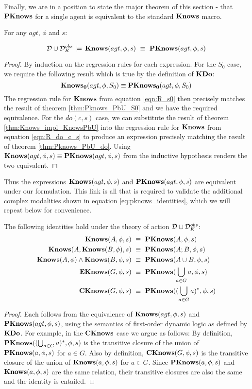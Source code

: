 Finally, we are in a position to state the major theorem of this section
- that $\mathbf{PKnows}$ for a single agent is equivalent to the standard
$\mathbf{Knows}$ macro.

\begin{thm}
For any $agt$, $\phi$ and $s$:

\[
\mathcal{D}\cup\mathcal{D}_{K}^{obs}\,\models\,\mathbf{Knows}(agt,\phi,s)\,\,\equiv\,\,\mathbf{PKnows}(agt,\phi,s)\]

\end{thm}
\begin{proof}
By induction on the regression rules for each expression. For the
$S_{0}$ case, we require the following result which is true by the
definition of $\mathbf{KDo}$:\[
\mathbf{Knows_{0}}(agt,\phi,S_{0})\equiv\mathbf{PKnows_{0}}(agt,\phi,S_{0})\]
 The regression rule for $\mathbf{Knows}$ from equation \eqref{eqn:R_s0}
then precisely matches the result of theorem \ref{thm:Pknows_PbU_S0}
and we have the required equivalence. For the $do(c,s)$ case, we
can substitute the result of theorem \ref{thm:Knows_impl_KnowsPbU}
into the regression rule for $\mathbf{Knows}$ from equation \eqref{eqn:R_do_c_s}
to produce an expression precisely matching the result of theorem
\ref{thm:Pknows_PbU_do}. Using $\mathbf{Knows}(agt,\phi,s)\equiv\mathbf{PKnows}(agt,\phi,s)$
from the inductive hypothesis renders the two equivalent. 
\end{proof}
\medskip{}


Thus the expressions $\mathbf{Knows}(agt,\phi,s)$ and $\mathbf{PKnows}(agt,\phi,s)$
are equivalent under our formulation. This link is all that is required
to validate the additional complex modalities shown in equation \eqref{eq:pknows_identities},
which we will repeat below for convenience.

\begin{thm}
The following identities hold under the theory of action $\mathcal{D}\cup\mathcal{D}_{K}^{obs}$:\begin{align*}
\mathbf{Knows}(A,\phi,s) & \,\,\equiv\,\,\mathbf{PKnows}(A,\phi,s)\\
\mathbf{Knows}(A,\mathbf{Knows}(B,\phi),s) & \,\,\equiv\,\,\mathbf{PKnows}(A;B,\phi,s)\\
\mathbf{Knows}(A,\phi)\wedge\mathbf{Knows}(B,\phi,s) & \,\,\equiv\,\,\mathbf{PKnows}(A\cup B,\phi,s)\\
\mathbf{EKnows}(G,\phi,s) & \,\,\equiv\,\,\mathbf{PKnows}(\bigcup_{a\in G}a,\phi,s)\\
\mathbf{CKnows}(G,\phi,s) & \,\,\equiv\,\,\mathbf{PKnows}((\bigcup_{a\in G}a)^{*},\phi,s)\end{align*}

\end{thm}
\begin{proof}
Each follows from the equivalence of $\mathbf{Knows}(agt,\phi,s)$ and $\mathbf{PKnows}(agt,\phi,s)$,
using the semantics of first-order dynamic logic as defined by $\mathbf{KDo}$.
For example, in the $\mathbf{CKnows}$ case we argue as follows: By definition,
$\mathbf{PKnows}((\bigcup_{a\in G}a)^{*},\phi,s)$ is the transitive closure
of the union of $\mathbf{PKnows}(a,\phi,s)$ for $a\in G$. Also by definition,
$\mathbf{CKnows}(G,\phi,s)$ is the transitive closure of the union of $\mathbf{Knows}(a,\phi,s)$
for $a\in G$. Since $\mathbf{PKnows}(a,\phi,s)$ and $\mathbf{Knows}(a,\phi,s)$
are the same relation, their transitive closures are also the same
and the identity is entailed. 
\end{proof}

